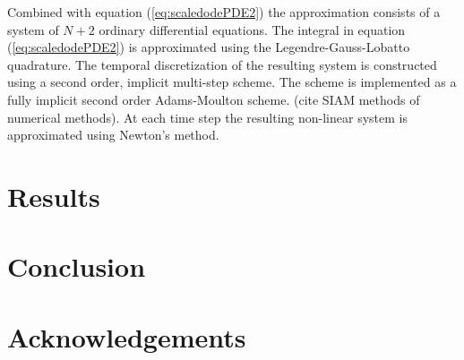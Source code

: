 \documentclass[12pt]{article}
\begin{document}
Combined with equation (\ref{eq:scaledodePDE2}) the approximation
consists of a system of $N+2$ ordinary differential equations. The
integral in equation (\ref{eq:scaledodePDE2}) is approximated using
the Legendre-Gauss-Lobatto quadrature. The temporal discretization of
the resulting system is constructed using a second order, implicit
multi-step scheme. The scheme is implemented as a fully implicit
second order Adams-Moulton scheme.  (cite SIAM methods of numerical
methods). At each time step the resulting non-linear system is
approximated using Newton's method.

\section{Results}
\label{section:results}

\section{Conclusion}

\section{Acknowledgements}



\end{document}
